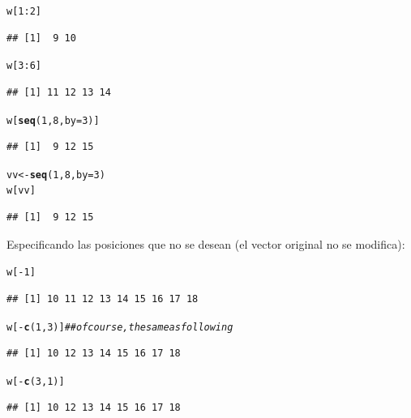 \documentclass{config/apuntes}\usepackage[]{graphicx}\usepackage[]{xcolor}
\makeatletter
\newcommand{\hlnum}[1]{\textcolor[rgb]{0.686,0.059,0.569}{#1}}%
\newcommand{\hlcom}[1]{\textcolor[rgb]{0.678,0.584,0.686}{\textit{#1}}}%
\newcommand{\hlopt}[1]{\textcolor[rgb]{0,0,0}{#1}}%
\newcommand{\hldef}[1]{\textcolor[rgb]{0.345,0.345,0.345}{#1}}%
\newcommand{\hlkwb}[1]{\textcolor[rgb]{0.69,0.353,0.396}{#1}}%
\newcommand{\hlkwc}[1]{\textcolor[rgb]{0.333,0.667,0.333}{#1}}%
\newcommand{\hlkwd}[1]{\textcolor[rgb]{0.737,0.353,0.396}{\textbf{#1}}}%
\newenvironment{kframe}{%
 \def\at@end@of@kframe{}%
 \ifinner\ifhmode%
  \def\at@end@of@kframe{\end{minipage}}%
  \begin{minipage}{\columnwidth}%
 \fi\fi%
 \def\FrameCommand##1{\hskip\@totalleftmargin \hskip-\fboxsep
 \colorbox{shadecolor}{##1}\hskip-\fboxsep
     \hskip-\linewidth \hskip-\@totalleftmargin \hskip\columnwidth}%
 \MakeFramed {\advance\hsize-\width
   \@totalleftmargin\z@ \linewidth\hsize
   \@setminipage}}%
 {\par\unskip\endMakeFramed%
 \at@end@of@kframe}
\newenvironment{knitrout}{}{} %
\makeatother
\begin{document}
\begin{knitrout}
\color{fgcolor}\begin{kframe}
\begin{alltt}
\hldef{w[}\hlnum{1}\hlopt{:}\hlnum{2}\hldef{]}
\end{alltt}
\begin{verbatim}
## [1]  9 10
\end{verbatim}
\begin{alltt}
\hldef{w[}\hlnum{3}\hlopt{:}\hlnum{6}\hldef{]}
\end{alltt}
\begin{verbatim}
## [1] 11 12 13 14
\end{verbatim}
\begin{alltt}
\hldef{w[}\hlkwd{seq}\hldef{(}\hlnum{1}\hldef{,} \hlnum{8}\hldef{,} \hlkwc{by} \hldef{=} \hlnum{3}\hldef{)]}
\end{alltt}
\begin{verbatim}
## [1]  9 12 15
\end{verbatim}
\begin{alltt}
\hldef{vv} \hlkwb{<-} \hlkwd{seq}\hldef{(}\hlnum{1}\hldef{,} \hlnum{8}\hldef{,} \hlkwc{by} \hldef{=} \hlnum{3}\hldef{)}
\hldef{w[vv]}
\end{alltt}
\begin{verbatim}
## [1]  9 12 15
\end{verbatim}
\end{kframe}
\end{knitrout}


Especificando las posiciones que no se desean (el vector original no se modifica):
\begin{knitrout}
\color{fgcolor}\begin{kframe}
\begin{alltt}
\hldef{w[}\hlopt{-}\hlnum{1}\hldef{]}
\end{alltt}
\begin{verbatim}
## [1] 10 11 12 13 14 15 16 17 18
\end{verbatim}
\begin{alltt}
\hldef{w[}\hlopt{-}\hlkwd{c}\hldef{(}\hlnum{1}\hldef{,} \hlnum{3}\hldef{)]} \hlcom{## of course, the same as following}
\end{alltt}
\begin{verbatim}
## [1] 10 12 13 14 15 16 17 18
\end{verbatim}
\begin{alltt}
\hldef{w[}\hlopt{-}\hlkwd{c}\hldef{(}\hlnum{3}\hldef{,} \hlnum{1}\hldef{)]}
\end{alltt}
\begin{verbatim}
## [1] 10 12 13 14 15 16 17 18
\end{verbatim}
\end{kframe}
\end{knitrout}
\end{document}
